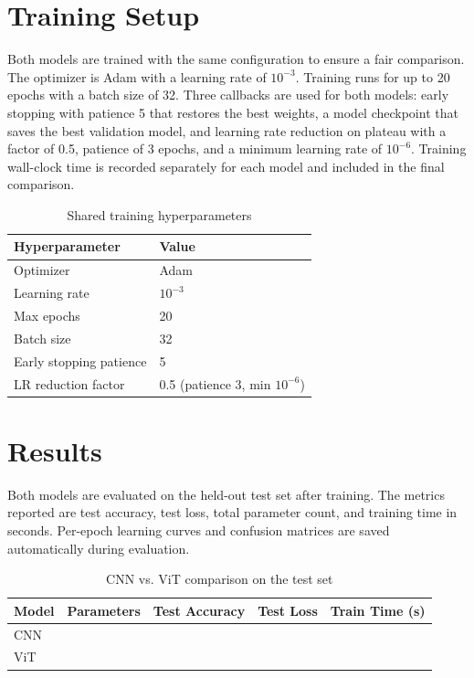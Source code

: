 \section{Training Setup}

Both models are trained with the same configuration to ensure a fair comparison. The optimizer is Adam with a learning rate of $10^{-3}$. Training runs for up to 20 epochs with a batch size of 32. Three callbacks are used for both models: early stopping with patience 5 that restores the best weights, a model checkpoint that saves the best validation model, and learning rate reduction on plateau with a factor of 0.5, patience of 3 epochs, and a minimum learning rate of $10^{-6}$. Training wall-clock time is recorded separately for each model and included in the final comparison.

\begin{table}[h]
\centering
\caption{Shared training hyperparameters}
\begin{tabular}{ll}
\toprule
\textbf{Hyperparameter} & \textbf{Value} \\
\midrule
Optimizer       & Adam \\
Learning rate   & $10^{-3}$ \\
Max epochs      & 20 \\
Batch size      & 32 \\
Early stopping patience & 5 \\
LR reduction factor     & 0.5 (patience 3, min $10^{-6}$) \\
\bottomrule
\end{tabular}
\end{table}

\section{Results}

Both models are evaluated on the held-out test set after training. The metrics reported are test accuracy, test loss, total parameter count, and training time in seconds. Per-epoch learning curves and confusion matrices are saved automatically during evaluation.

\begin{table}[h]
\centering
\caption{CNN vs. ViT comparison on the test set}
\begin{tabular}{lcccc}
\toprule
\textbf{Model} & \textbf{Parameters} & \textbf{Test Accuracy} & \textbf{Test Loss} & \textbf{Train Time (s)} \\
\midrule
CNN & & & & \\
ViT & & & & \\
\bottomrule
\end{tabular}
\end{table}

